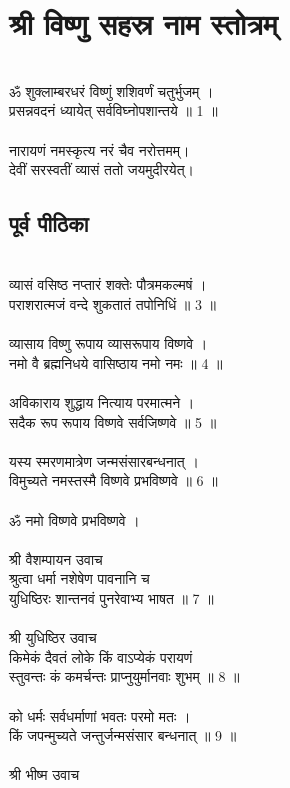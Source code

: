 \section{श्री विष्णु सहस्र नाम स्तोत्रम्}
\\
ॐ शुक्लाम्बरधरं विष्णुं शशिवर्णं चतुर्भुजम् ।\\
प्रसन्नवदनं ध्यायेत् सर्वविघ्नोपशान्तये ॥ 1 ॥\\
\\
नारायणं नमस्कृत्य नरं चैव नरोत्तमम्। \\
देवीं सरस्वतीं व्यासं ततो जयमुदीरयेत्।\\
\subsection{पूर्व पीठिका}
\\
व्यासं वसिष्ठ नप्तारं शक्तेः पौत्रमकल्मषं ।\\
पराशरात्मजं वन्दे शुकतातं तपोनिधिं ॥ 3 ॥\\
\\
व्यासाय विष्णु रूपाय व्यासरूपाय विष्णवे ।\\
नमो वै ब्रह्मनिधये वासिष्ठाय नमो नमः ॥ 4 ॥\\
\\
अविकाराय शुद्धाय नित्याय परमात्मने ।\\
सदैक रूप रूपाय विष्णवे सर्वजिष्णवे ॥ 5 ॥\\
\\
यस्य स्मरणमात्रेण जन्मसंसारबन्धनात् ।\\
विमुच्यते नमस्तस्मै विष्णवे प्रभविष्णवे ॥ 6 ॥\\
\\
ॐ नमो विष्णवे प्रभविष्णवे ।\\
\\
श्री वैशम्पायन उवाच\\
श्रुत्वा धर्मा नशेषेण पावनानि च \\
युधिष्ठिरः शान्तनवं पुनरेवाभ्य भाषत ॥ 7 ॥\\
\\
श्री युधिष्ठिर उवाच\\
किमेकं दैवतं लोके किं वाऽप्येकं परायणं\\
स्तुवन्तः कं कमर्चन्तः प्राप्नुयुर्मानवाः शुभम् ॥ 8 ॥\\
\\
को धर्मः सर्वधर्माणां भवतः परमो मतः ।\\
किं जपन्मुच्यते जन्तुर्जन्मसंसार बन्धनात् ॥ 9 ॥\\
\\
श्री भीष्म उवाच\\

